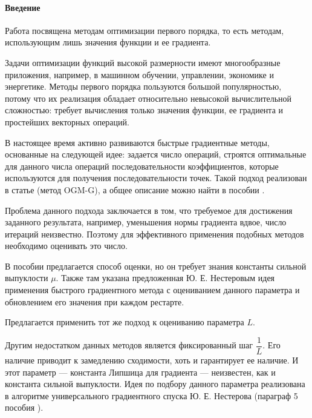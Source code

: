 \documentclass{crm-article}
\begin{document}
\maketitle

\paragraph{Введение}
Работа посвящена методам оптимизации первого порядка, то есть методам, использующим лишь значения функции и ее градиента.

Задачи оптимизации функций высокой размерности имеют многообразные приложения, например, в машинном обучении, управлении, экономике и энергетике. Методы первого порядка пользуются большой популярностью, потому что их реализация обладает относительно невысокой вычислительной сложностью: требует вычисления только значения функции, ее градиента и простейших векторных операций.

В настоящее время активно развиваются быстрые градиентные методы, основанные на следующей идее: задается число операций, строятся оптимальные для данного числа операций последовательности коэффициентов, которые используются для получения последовательности точек. Такой подход реализован в статье \cite{kim2018fessler} (метод OGM-G), а общее описание можно найти в пособии \cite{gasnikov2017universal}.

Проблема данного подхода заключается в том, что требуемое для достижения заданного результата, например, уменьшения нормы градиента вдвое, число итераций неизвестно. Поэтому для эффективного применения подобных методов необходимо оценивать это число.

В пособии \cite{gasnikov2017universal} предлагается способ оценки, но он требует знания константы сильной выпуклости $\mu$. Также там указана предложенная Ю. Е. Нестеровым идея применения быстрого градиентного метода с оцениванием данного параметра и обновлением его значения при каждом рестарте.

Предлагается применить тот же подход к оцениванию параметра $L$.

Другим недостатком данных методов является фиксированный шаг $\dfrac{1}{L}$. Его наличие приводит к замедлению сходимости, хоть и гарантирует ее наличие. И этот параметр --- константа Липшица для градиента --- неизвестен, как и константа сильной выпуклости. Идея по подбору данного параметра реализована в алгоритме универсального градиентного спуска Ю. Е. Нестерова (параграф 5 пособия \cite{gasnikov2017universal}).
\end{document}
